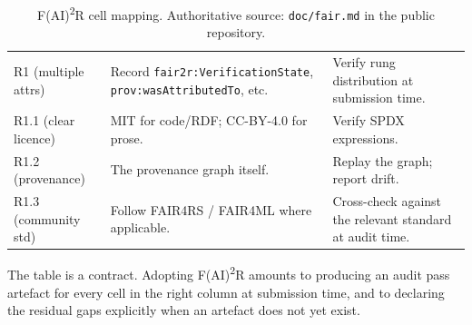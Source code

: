 \begin{table}[!ht]
\begin{tabular}{lp{4.6cm}p{4.6cm}}
R1 (multiple attrs)   & Record \texttt{fair2r:VerificationState}, \texttt{prov:wasAttributedTo}, etc. & Verify rung distribution at submission time. \\
R1.1 (clear licence)  & MIT for code/RDF; CC-BY-4.0 for prose. & Verify SPDX expressions. \\
R1.2 (provenance)     & The provenance graph itself. & Replay the graph; report drift. \\
R1.3 (community std)  & Follow FAIR4RS / FAIR4ML where applicable. & Cross-check against the relevant standard at audit time. \\
\bottomrule
\end{tabular}
\caption{F(AI)\textsuperscript{2}R cell mapping. Authoritative source:
\texttt{doc/fair.md} in the public repository.}
\label{tab:cells}
\end{table}

The table is a contract. Adopting F(AI)\textsuperscript{2}R amounts to
producing an audit pass artefact for every cell in the right column at
submission time, and to declaring the residual gaps explicitly when an
artefact does not yet exist.
